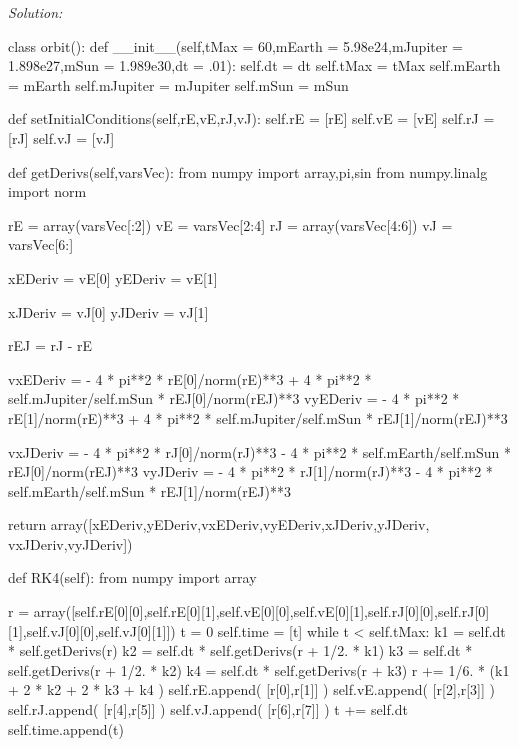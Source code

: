 \ifsolutions
\textit{Solution:}\\
\begin{codeexample}
\begin{VerbatimOut}{\listingFile}


class orbit():
    def __init__(self,tMax = 60,mEarth = 5.98e24,mJupiter = 1.898e27,mSun = 1.989e30,dt = .01):
        self.dt = dt
        self.tMax = tMax
        self.mEarth = mEarth
        self.mJupiter = mJupiter
        self.mSun = mSun

    def setInitialConditions(self,rE,vE,rJ,vJ):
        self.rE = [rE]
        self.vE = [vE]
        self.rJ = [rJ]
        self.vJ = [vJ]
        

    def getDerivs(self,varsVec):
        from numpy import array,pi,sin
        from numpy.linalg import norm

        rE = array(varsVec[:2])
        vE = varsVec[2:4]
        rJ = array(varsVec[4:6])
        vJ = varsVec[6:]

        xEDeriv = vE[0]
        yEDeriv = vE[1]

        xJDeriv = vJ[0]
        yJDeriv = vJ[1]

        rEJ = rJ - rE
        
        vxEDeriv = - 4 * pi**2 * rE[0]/norm(rE)**3 + 4 * pi**2 * self.mJupiter/self.mSun * rEJ[0]/norm(rEJ)**3
        vyEDeriv = - 4 * pi**2 * rE[1]/norm(rE)**3 + 4 * pi**2 * self.mJupiter/self.mSun * rEJ[1]/norm(rEJ)**3

        vxJDeriv = - 4 * pi**2 * rJ[0]/norm(rJ)**3 - 4 * pi**2 * self.mEarth/self.mSun * rEJ[0]/norm(rEJ)**3
        vyJDeriv = - 4 * pi**2 * rJ[1]/norm(rJ)**3 - 4 * pi**2 * self.mEarth/self.mSun * rEJ[1]/norm(rEJ)**3

        return array([xEDeriv,yEDeriv,vxEDeriv,vyEDeriv,xJDeriv,yJDeriv, vxJDeriv,vyJDeriv])


    def RK4(self):
        from numpy import array

        r = array([self.rE[0][0],self.rE[0][1],self.vE[0][0],self.vE[0][1],self.rJ[0][0],self.rJ[0][1],self.vJ[0][0],self.vJ[0][1]])
        t = 0
        self.time = [t]
        while t < self.tMax:
            k1 = self.dt * self.getDerivs(r)
            k2 = self.dt * self.getDerivs(r + 1/2. * k1)
            k3 = self.dt * self.getDerivs(r + 1/2. * k2)
            k4 = self.dt * self.getDerivs(r + k3)
            r += 1/6. * (k1 + 2 * k2 + 2 * k3 + k4 )
            self.rE.append( [r[0],r[1]]  )
            self.vE.append( [r[2],r[3]]  )
            self.rJ.append( [r[4],r[5]]  )
            self.vJ.append( [r[6],r[7]]  )
            t += self.dt
            self.time.append(t)



\end{VerbatimOut}
\end{codeexample}
